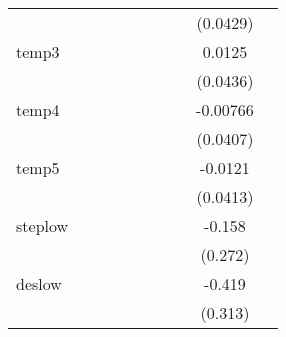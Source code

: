 {\begin{tabular}{l*{9}{c}}
            &                     &                     &                     &                     &                     &                     &                     &    (0.0429)         &                     \\
[1em]
temp3       &                     &                     &                     &                     &                     &                     &                     &      0.0125         &                     \\
            &                     &                     &                     &                     &                     &                     &                     &    (0.0436)         &                     \\
[1em]
temp4       &                     &                     &                     &                     &                     &                     &                     &    -0.00766         &                     \\
            &                     &                     &                     &                     &                     &                     &                     &    (0.0407)         &                     \\
[1em]
temp5       &                     &                     &                     &                     &                     &                     &                     &     -0.0121         &                     \\
            &                     &                     &                     &                     &                     &                     &                     &    (0.0413)         &                     \\
[1em]
steplow     &                     &                     &                     &                     &                     &                     &                     &      -0.158         &                     \\
            &                     &                     &                     &                     &                     &                     &                     &     (0.272)         &                     \\
[1em]
deslow      &                     &                     &                     &                     &                     &                     &                     &      -0.419         &                     \\
            &                     &                     &                     &                     &                     &                     &                     &     (0.313)         &                     \\

\end{tabular}}
